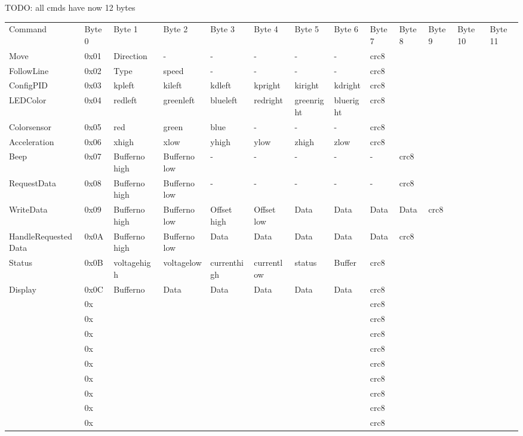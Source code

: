 \documentclass[a4paper]{article}
\begin{document}
\begin{landscape}

TODO: all cmds have now 12 bytes

\begin{tabular}{lllllllll}
Command &
    Byte 0 &
    Byte 1 &
    Byte 2 &
    Byte 3 &
    Byte 4 &
    Byte 5 &
    Byte 6 &
    Byte 7 &
    Byte 8 &
    Byte 9 &
    Byte 10 &
    Byte 11 \\
Move &
    0x01 &
    Direction &
    - &
    - &
    - &
    - &
    - &
    crc8 \\
FollowLine &
    0x02 &
    Type &
    speed &
    - &
    - &
    - &
    - &
    crc8 \\
ConfigPID &
    0x03 &
    kpleft &
    kileft &
    kdleft &
    kpright &
    kiright &
    kdright &
    crc8 \\
LEDColor &
    0x04 &
    redleft &
    greenleft &
    blueleft &
    redright &
    greenright &
    blueright &
    crc8 \\
Colorsensor &
    0x05 &
    red &
    green &
    blue &
    - &
    - &
    - &
    crc8 \\
Acceleration &
    0x06 &
    xhigh &
    xlow &
    yhigh &
    ylow &
    zhigh &
    zlow &
    crc8 \\
Beep &
    0x07 &
    Bufferno high &
    Bufferno low &
    - &
    - &
    - &
    - &
    - &
    crc8 \\
RequestData &
    0x08 &
    Bufferno high &
    Bufferno low &
    - &
    - &
    - &
    - &
    - &
    crc8 \\
WriteData &
    0x09 &
    Bufferno high &
    Bufferno low &
    Offset high &
    Offset low &
    Data &
    Data &
    Data &
    Data &
    crc8 \\
HandleRequestedData &
    0x0A &
    Bufferno high &
    Bufferno low &
    Data &
    Data &
    Data &
    Data &
    Data &
    crc8 \\
Status &
    0x0B &
    voltagehigh &
    voltagelow &
    currenthigh &
    currentlow &
    status &
    Buffer &
    crc8 \\
Display &
    0x0C &
    Bufferno &
    Data &
    Data &
    Data &
    Data &
    Data &
    crc8 \\
 &
    0x &
     &
     &
     &
     &
     &
     &
    crc8 \\
 &
    0x &
     &
     &
     &
     &
     &
     &
    crc8 \\
 &
    0x &
     &
     &
     &
     &
     &
     &
    crc8 \\
 &
    0x &
     &
     &
     &
     &
     &
     &
    crc8 \\
 &
    0x &
     &
     &
     &
     &
     &
     &
    crc8 \\
 &
    0x &
     &
     &
     &
     &
     &
     &
    crc8 \\
 &
    0x &
     &
     &
     &
     &
     &
     &
    crc8 \\
 &
    0x &
     &
     &
     &
     &
     &
     &
    crc8 \\
 &
    0x &
     &
     &
     &
     &
     &
     &
    crc8 \\

\end{tabular}
\end{landscape}
\end{document}
